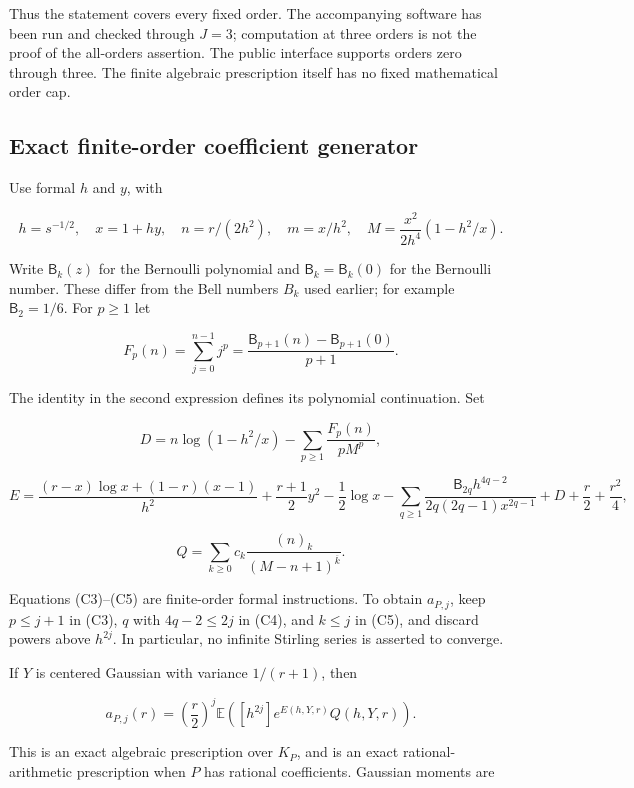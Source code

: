 Thus the statement covers every fixed order. The accompanying software
has been run and checked through \(J=3\); computation at three orders is
not the proof of the all-orders assertion. The public interface supports
orders zero through three. The finite algebraic prescription itself has
no fixed mathematical order cap.

\subsection{Exact finite-order coefficient
generator}\label{tcl:exact-finite-order-coefficient-generator}

Use formal \(h\) and \(y\), with

\[
 h=s^{-1/2},\quad x=1+hy,\quad n=r/(2h^2),\quad
 m=x/h^2,\quad M=\frac{x^2}{2h^4}(1-h^2/x).
\]

Write $\mathsf B_k(z)$ for the Bernoulli polynomial and
$\mathsf B_k=\mathsf B_k(0)$ for the Bernoulli number. These differ from
the Bell numbers $B_k$ used earlier; for example $\mathsf B_2=1/6$.
For \(p\ge1\) let

\[
 F_p(n)=\sum_{j=0}^{n-1}j^p
       =\frac{\mathsf B_{p+1}(n)-\mathsf B_{p+1}(0)}{p+1}.
\]

The identity in the second expression defines its polynomial
continuation. Set

\[
 D=n\log(1-h^2/x)-\sum_{p\ge1}\frac{F_p(n)}{pM^p},
 \tag{C3}\label{tcl:eq:C3}
\]

\[
 E=\frac{(r-x)\log x+(1-r)(x-1)}{h^2}
 +\frac{r+1}{2}y^2-\frac12\log x
 -\sum_{q\ge1}\frac{\mathsf B_{2q}h^{4q-2}}{2q(2q-1)x^{2q-1}}
 +D+\frac r2+\frac{r^2}4,
 \tag{C4}\label{tcl:eq:C4}
\]

\[
 Q=\sum_{k\ge0}c_k\frac{(n)_k}{(M-n+1)^{\overline{k}}}.
 \tag{C5}\label{tcl:eq:C5}
\]

Equations (C3)--(C5) are finite-order formal instructions. To obtain
\(a_{P,j}\), keep \(p\le j+1\) in (C3), \(q\) with \(4q-2\le2j\) in
(C4), and \(k\le j\) in (C5), and discard powers above \(h^{2j}\). In
particular, no infinite Stirling series is asserted to converge.

If \(Y\) is centered Gaussian with variance \(1/(r+1)\), then

\[
 a_{P,j}(r)=\left(\frac r2\right)^j
 \mathbb E\left([h^{2j}]e^{E(h,Y,r)}Q(h,Y,r)\right).
 \tag{C6}\label{tcl:eq:C6}
\]

This is an exact algebraic prescription over \(K_P\), and is an exact
rational-arithmetic prescription when \(P\) has rational coefficients.
Gaussian moments are

